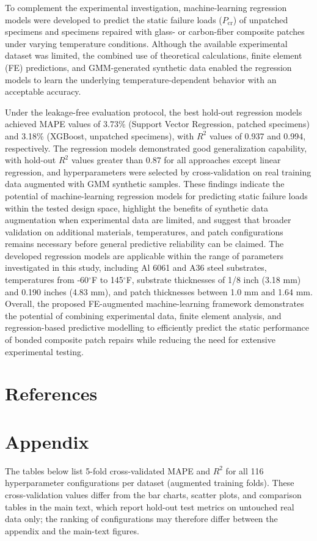 \documentclass[journal,article,submit,pdftex,moreauthors]{Definitions/mdpi}
\begin{document}
To complement the experimental investigation, machine-learning regression models were developed to predict the static failure loads ($P_{\mathrm{cr}}$) of unpatched specimens and specimens repaired with glass- or carbon-fiber composite patches under varying temperature conditions.  Although the available experimental dataset was limited, the combined use of theoretical calculations, finite element (FE) predictions, and GMM-generated synthetic data enabled the regression models to learn the underlying temperature-dependent behavior with an acceptable accuracy. 


Under the leakage-free evaluation protocol, the best hold-out regression models achieved MAPE values of 3.73\% (Support Vector Regression, patched specimens) and 3.18\% (XGBoost, unpatched specimens), with $R^2$ values of 0.937 and 0.994, respectively. The regression models demonstrated good generalization capability, with hold-out $R^2$ values greater than 0.87 for all approaches except linear regression, and hyperparameters were selected by cross-validation on real training data augmented with GMM synthetic samples. These findings indicate the potential of machine-learning regression models for predicting static failure loads within the tested design space, highlight the benefits of synthetic data augmentation when experimental data are limited, and suggest that broader validation on additional materials, temperatures, and patch configurations remains necessary before general predictive reliability can be claimed. The developed regression models are applicable within the range of parameters investigated in this study, including Al 6061 and A36 steel substrates, temperatures from -60$^\circ$F to 145$^\circ$F, substrate thicknesses of 1/8 inch (3.18 mm) and 0.190 inches (4.83 mm), and patch thicknesses between 1.0 mm and 1.64 mm. Overall, the proposed FE-augmented machine-learning framework demonstrates the potential of combining experimental data, finite element analysis, and regression-based predictive modelling to efficiently predict the static performance of bonded composite patch repairs while reducing the need for extensive experimental testing.

\FloatBarrier
\newpage
\section*{References}
%

\newpage
\section*{Appendix}
The tables below list 5-fold cross-validated MAPE and $R^2$ for all 116 hyperparameter configurations per dataset (augmented training folds). These cross-validation values differ from the bar charts, scatter plots, and comparison tables in the main text, which report hold-out test metrics on untouched real data only; the ranking of configurations may therefore differ between the appendix and the main-text figures.
\end{document}
